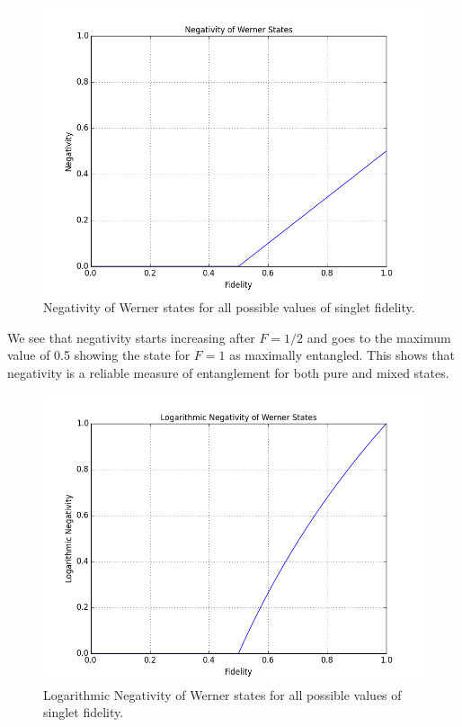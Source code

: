 \begin{figure}[H]
  \begin{center}
    \includegraphics[scale=0.62]{figures/wernerstates-negativity.png}
    \caption{Negativity of Werner states for all possible values of singlet fidelity.}
    \label{fig: Werner States: Negativity}
  \end{center}
\end{figure}

We see that negativity starts increasing after $F=1/2$ and goes to the maximum value of 0.5 showing the state for $F=1$ as maximally entangled. This shows that negativity is a reliable measure of entanglement for both pure and mixed states.

\begin{figure}[H]
  \begin{center}
    \includegraphics[scale=0.62]{figures/wernerstates-logneg.png}
    \caption{Logarithmic Negativity of Werner states for all possible values of singlet fidelity.}
    \label{fig: Werner States: Logarithmic Negativity}
  \end{center}
\end{figure}

